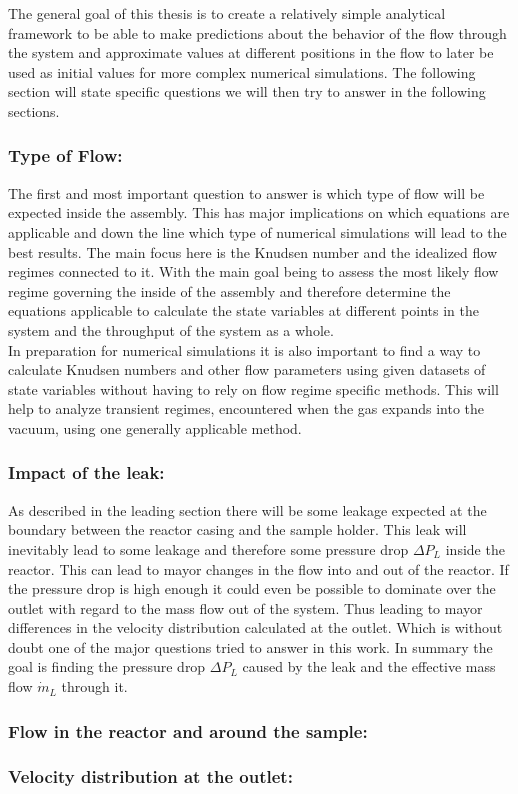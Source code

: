 
	The general goal of this thesis is to create a relatively simple analytical framework to be able to make predictions about the behavior of the flow through the system and approximate values at different positions in the flow to later be used as initial values for more complex numerical simulations.
	The following section will state specific questions we will then try to answer in the following sections.
	
\subsubsection{Type of Flow:}

	The first and most important question to answer is which type of flow will be expected inside the assembly.
	This has major implications on which equations are applicable and down the line which type of numerical simulations will lead to the best results.
	The main focus here is the Knudsen number and the idealized flow regimes connected to it.
	With the main goal being to assess the most likely flow regime governing the inside of the assembly and therefore determine the equations applicable to calculate the state variables at different points in the system and the throughput of the system as a whole.\\
	In preparation for numerical simulations it is also important to find a way to calculate Knudsen numbers and other flow parameters using given datasets of state variables without having to rely on flow regime specific methods. This will help to analyze transient regimes, encountered when the gas expands into the vacuum, using one generally applicable method.  

\subsubsection{Impact of the leak:}

	As described in the leading section there will be some leakage expected at the boundary between the reactor casing and the sample holder.
	This leak will inevitably lead to some leakage and therefore some pressure drop $\Delta P_L$ inside the reactor.
	This can lead to mayor changes in the flow into and out of the reactor.
	If the pressure drop is high enough it could even be possible to dominate over the outlet with regard to the mass flow out of the system.
	Thus leading to mayor differences in the velocity distribution calculated at the outlet.
	Which is without doubt one of the major questions tried to answer in this work.
	In summary the goal is finding the pressure drop $\Delta P_L$ caused by the leak and the effective mass flow $\dot{m}_L$ through it.
	
\subsubsection{Flow in the reactor and around the sample:}

\subsubsection{Velocity distribution at the outlet:}
